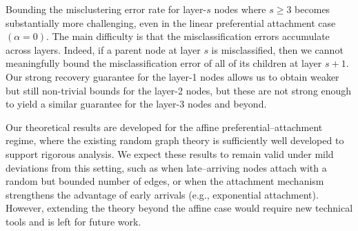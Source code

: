 \documentclass[twoside,11pt]{article}
\theoremstyle{remark}
\begin{document}


Bounding the misclustering error rate for layer-$s$ nodes where $s \geq 3$ becomes substantially more challenging, even in the linear preferential attachment case $(\alpha=0)$. The main difficulty is that the misclassification errors accumulate across layers. Indeed, if a parent node at layer $s$ is misclassified, then we cannot meaningfully bound the misclassification error of all of its children at layer $s+1$. Our strong recovery guarantee for the layer-1 nodes allows us to obtain weaker but still non-trivial bounds for the layer-2 nodes, but these are not strong enough to yield a similar guarantee for the layer-3 nodes and beyond. 






Our theoretical results are developed for the affine preferential–attachment regime, where the existing random graph theory is sufficiently well developed to support rigorous analysis.
We expect these results to remain valid under mild deviations from this setting, such as when late–arriving nodes attach with a random but bounded number of edges, or when the attachment mechanism strengthens the advantage of early arrivals (e.g., exponential attachment).
However, extending the theory beyond the affine case would require new technical tools and is left for future work.
\end{document}
